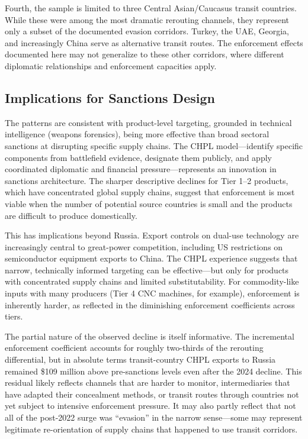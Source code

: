 \documentclass[12pt]{article}
\begin{document}
Fourth, the sample is limited to three Central Asian/Caucasus transit countries. While these were among the most dramatic rerouting channels, they represent only a subset of the documented evasion corridors. Turkey, the UAE, Georgia, and increasingly China serve as alternative transit routes. The enforcement effects documented here may not generalize to these other corridors, where different diplomatic relationships and enforcement capacities apply.

\subsection{Implications for Sanctions Design}

The patterns are consistent with product-level targeting, grounded in technical intelligence (weapons forensics), being more effective than broad sectoral sanctions at disrupting specific supply chains. The CHPL model---identify specific components from battlefield evidence, designate them publicly, and apply coordinated diplomatic and financial pressure---represents an innovation in sanctions architecture. The sharper descriptive declines for Tier 1--2 products, which have concentrated global supply chains, suggest that enforcement is most viable when the number of potential source countries is small and the products are difficult to produce domestically.

This has implications beyond Russia. Export controls on dual-use technology are increasingly central to great-power competition, including US restrictions on semiconductor equipment exports to China. The CHPL experience suggests that narrow, technically informed targeting can be effective---but only for products with concentrated supply chains and limited substitutability. For commodity-like inputs with many producers (Tier 4 CNC machines, for example), enforcement is inherently harder, as reflected in the diminishing enforcement coefficients across tiers.

The partial nature of the observed decline is itself informative. The incremental enforcement coefficient accounts for roughly two-thirds of the rerouting differential, but in absolute terms transit-country CHPL exports to Russia remained \$109 million above pre-sanctions levels even after the 2024 decline. This residual likely reflects channels that are harder to monitor, intermediaries that have adapted their concealment methods, or transit routes through countries not yet subject to intensive enforcement pressure. It may also partly reflect that not all of the post-2022 surge was ``evasion'' in the narrow sense---some may represent legitimate re-orientation of supply chains that happened to use transit corridors.
\end{document}
